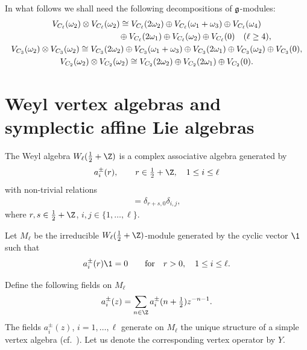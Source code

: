 In what follows we shall need the following decompositions of $\frak
g$-modules:
%
\begin{gather}
V_{C_{\ell }} (\omega_2) \otimes V_{C_{\ell }} ( \omega_2) \cong
V_{C_{\ell }} (2 \omega_2)\oplus V_{C_{\ell }} ( \omega_1 +
\omega_3) \oplus V_{C_{\ell }} (\omega_4)
\nonumber \\
\hphantom{V_{C_{\ell }} (\omega_2) \otimes V_{C_{\ell }} ( \omega_2) \cong}{}
 \oplus V_{C_{\ell }} (2\omega_1) \oplus
V_{C_{\ell}} ( \omega_2) \oplus V_{C_{\ell }} (0)  \quad ( \ell \ge 4),  \nonumber \\
 V_{C_{3}} (\omega_2) \otimes V_{C_{3}} ( \omega_2) \cong
 V_{C_{3}} (2 \omega_2)\oplus V_{C_{3}} ( \omega_1 +
\omega_3) \oplus V_{C_{3}} (2\omega_1) \oplus
V_{C_{3}} ( \omega_2) \oplus V_{C_{3}} (0), \nonumber \\
 V_{C_{2}}(\omega _2) \otimes V_{C_{2}}(\omega _2) \cong
V_{C_{2}}(2 \omega _2) \oplus V_{C_{2}}(2 \omega _1) \oplus V_{C_{2}}(0). \label{tens-pr-decomp}
 \end{gather}



\section{Weyl vertex algebras and symplectic af\/f\/ine Lie algebras}

The Weyl algebra $W_{\ell}( \tfrac{1}{2} + {\Z})$ is a complex
associative algebra generated by
\[  a ^{\pm} _{i}(r),  \qquad   r  \in \tfrac{1}{2} + {\Z}, \quad 1 \le i
\le \ell
\] with non-trivial relations
\begin{gather*}
 [a_{i} ^{+}(r)  , a_{j} ^{-}(s)  ]  =\delta_{r+s,0} \delta_{i,j},
\end{gather*}
where $r, s \in {\tfrac{1}{2}}+ {\Z}$, $ i, j \in \{1, \dots, \ell
\}$.



 Let $M_{\ell}$ be the irreducible $W_{\ell}( \tfrac{1}{2} + {\Z})$-module generated by
 the
cyclic vector ${\1}$ such that
\[ a^{\pm} _i  (r) {\1}     =  0 \qquad \mbox{for} \quad r > 0 ,  \quad 1
\le i \le \ell.
\]



Def\/ine the following   f\/ields on $M_{\ell}$
%
\[   a_i ^{\pm }(z) = \sum_{ n \in   {\Z}
 } a_i ^{\pm }(n+ \tfrac{1}{2} )  z ^{-n- 1}.
 \]
 The f\/ields $a_{i} ^{\pm }(z)$, $i =1, \dots, \ell$ generate on $M_{\ell}$  the
unique structure of a simple vertex algebra (cf.~\cite{FrB, K}). Let us denote the corresponding vertex operator by $Y$.


